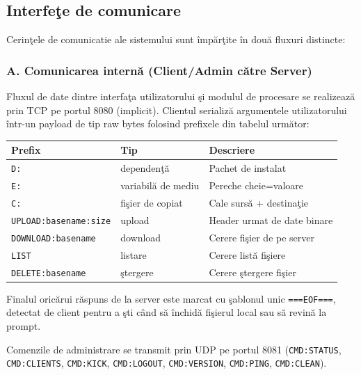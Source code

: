 \documentclass[12pt, a4paper]{article}
\begin{document}
\subsection{Interfe\c{t}e de comunicare}

Cerin\c{t}ele de comunicatie ale sistemului sunt \^{i}mp\u{a}r\c{t}ite \^{i}n dou\u{a} fluxuri distincte:

\subsubsection*{A. Comunicarea intern\u{a} (Client/Admin c\u{a}tre Server)}

Fluxul de date dintre interfa\c{t}a utilizatorului \c{s}i modulul de procesare se realizeaz\u{a} prin TCP pe
portul 8080 (implicit). Clientul serializ\u{a} argumentele utilizatorului \^{i}ntr-un payload de tip raw bytes
folosind prefixele din tabelul urm\u{a}tor:

\begin{center}
\begin{tabular}{lll}
\toprule
\textbf{Prefix} & \textbf{Tip} & \textbf{Descriere} \\
\midrule
\texttt{D:}                   & dependen\c{t}\u{a}          & Pachet de instalat \\
\texttt{E:}                   & variabil\u{a} de mediu     & Pereche cheie=valoare \\
\texttt{C:}                   & fi\c{s}ier de copiat        & Cale surs\u{a} + destina\c{t}ie \\
\texttt{UPLOAD:basename:size} & upload                     & Header urmat de date binare \\
\texttt{DOWNLOAD:basename}    & download                   & Cerere fi\c{s}ier de pe server \\
\texttt{LIST}                 & listare                    & Cerere list\u{a} fi\c{s}iere \\
\texttt{DELETE:basename}      & \c{s}tergere                & Cerere \c{s}tergere fi\c{s}ier \\
\bottomrule
\end{tabular}
\end{center}

Finalul oric\u{a}rui r\u{a}spuns de la server este marcat cu \c{s}ablonul unic \texttt{===EOF===}, detectat de client
pentru a \c{s}ti c\^{a}nd s\u{a} \^{i}nchid\u{a} fi\c{s}ierul local sau s\u{a} revin\u{a} la prompt.

Comenzile de administrare se transmit prin UDP pe portul 8081 (\texttt{CMD:STATUS}, \texttt{CMD:CLIENTS},
\texttt{CMD:KICK}, \texttt{CMD:LOGOUT}, \texttt{CMD:VERSION}, \texttt{CMD:PING}, \texttt{CMD:CLEAN}).
\end{document}
